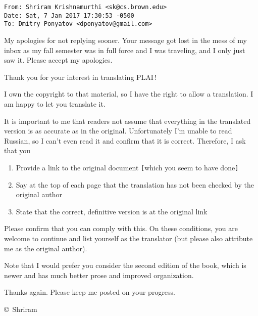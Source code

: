 \clearpage\label{krishna}
\begin{verbatim}
From: Shriram Krishnamurthi <sk@cs.brown.edu>
Date: Sat, 7 Jan 2017 17:30:53 -0500
To: Dmitry Ponyatov <dponyatov@gmail.com>
\end{verbatim}

My apologies for not replying sooner. Your message got lost in the mess of my
inbox as my fall semester was in full force and I was traveling, and I only just
saw it. Please accept my apologies.

\bigskip
Thank you for your interest in translating PLAI\,!

\bigskip
I own the copyright to that material, so I have the right to allow a
translation. I am happy to let you translate it.

\bigskip
It is important to me that readers not assume that everything in the translated
version is as accurate as in the original. Unfortunately I'm unable to read
Russian, so I can't even read it and confirm that it is correct. Therefore, I
ask that you

\begin{enumerate}[nosep]
  \item 
Provide a link to the original document
\verb|[|which you seem to have done\verb|]|
  \item 
Say at the top of each page that the translation has not been checked by the
original author
  \item 
State that the correct, definitive version is at the original link
\end{enumerate}

Please confirm that you can comply with this. On these conditions, you are
welcome to continue and list yourself as the translator (but please also
attribute me as the original author).

\bigskip
Note that I would prefer you consider the second edition of the book, which is
newer and has much better prose and improved organization.

\bigskip
Thanks again. Please keep me posted on your progress.

\bigskip\copyright\ Shriram
